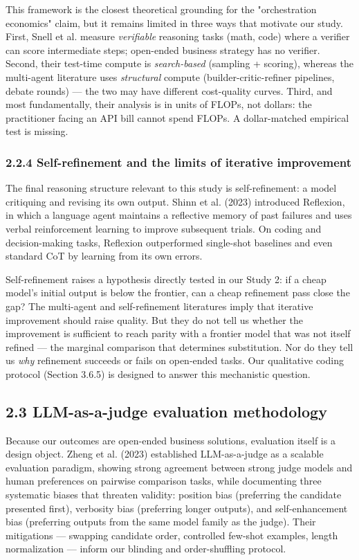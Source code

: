 \documentclass[11pt,a4paper]{article}
\begin{document}
This framework is the closest theoretical grounding for the "orchestration
economics" claim, but it remains limited in three ways that motivate our
study. First, Snell et al. measure \textit{verifiable} reasoning tasks (math,
code) where a verifier can score intermediate steps; open-ended business
strategy has no verifier. Second, their test-time compute is
\textit{search-based} (sampling + scoring), whereas the multi-agent literature
uses \textit{structural} compute (builder-critic-refiner pipelines, debate rounds)
— the two may have different cost-quality curves. Third, and most
fundamentally, their analysis is in units of FLOPs, not dollars: the
practitioner facing an API bill cannot spend FLOPs. A dollar-matched
empirical test is missing.

\subsubsection{2.2.4 Self-refinement and the limits of iterative improvement}

The final reasoning structure relevant to this study is self-refinement:
a model critiquing and revising its own output. Shinn et al. (2023)
introduced Reflexion, in which a language agent maintains a reflective
memory of past failures and uses verbal reinforcement learning to improve
subsequent trials. On coding and decision-making tasks, Reflexion
outperformed single-shot baselines and even standard CoT by learning from
its own errors.

Self-refinement raises a hypothesis directly tested in our Study 2: if a
cheap model's initial output is below the frontier, can a cheap refinement
pass close the gap? The multi-agent and self-refinement literatures imply
that iterative improvement should raise quality. But they do not tell us
whether the improvement is sufficient to reach parity with a frontier model
that was not itself refined — the marginal comparison that determines
substitution. Nor do they tell us \textit{why} refinement succeeds or fails on
open-ended tasks. Our qualitative coding protocol (Section 3.6.5) is
designed to answer this mechanistic question.

\subsection{2.3 LLM-as-a-judge evaluation methodology}

Because our outcomes are open-ended business solutions, evaluation itself is
a design object. Zheng et al. (2023) established LLM-as-a-judge as a
scalable evaluation paradigm, showing strong agreement between strong judge
models and human preferences on pairwise comparison tasks, while documenting
three systematic biases that threaten validity: position bias (preferring
the candidate presented first), verbosity bias (preferring longer outputs),
and self-enhancement bias (preferring outputs from the same model family as
the judge). Their mitigations — swapping candidate order, controlled
few-shot examples, length normalization — inform our blinding and
order-shuffling protocol.
\end{document}
